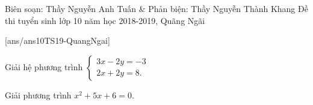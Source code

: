 \begin{name}
{Biên soạn: Thầy Nguyễn Anh Tuấn \& Phản biện: Thầy Nguyễn Thành Khang}
{Đề thi tuyển sinh lớp 10 năm học 2018-2019, Quãng Ngãi}
\end{name}
\setcounter{ex}{0}
[ans/ans10TS19-QuangNgai]
\begin{ex}%
 Giải hệ phương trình $ \begin{cases}
		3x-2y=-3\\ 2x+2y=8. \end{cases}$
\end{ex}
\begin{ex}%
	 Giải phương trình $ x^2+5x+6=0 $.
\end{ex}
